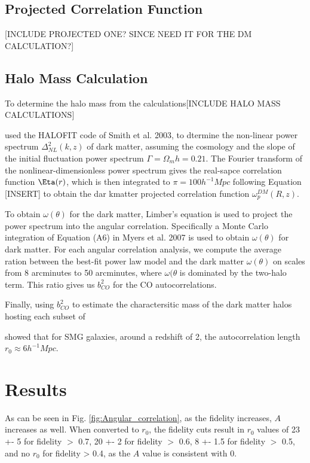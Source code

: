 \subsection{Projected Correlation Function}

[INCLUDE PROJECTED ONE? SINCE NEED IT FOR THE DM CALCULATION?]

\subsection{Halo Mass Calculation}

To determine the halo mass from the calculations[INCLUDE HALO MASS CALCULATIONS]

\cite{hickox2011clustering} used the HALOFIT code of Smith et al. 2003, to dtermine the non-linear power spectrum $\Delta_{NL}^2(k,z)$ of dark matter, assuming the cosmology and the slope of the initial fluctuation power spectrum $\Gamma = \Omega_mh = 0.21$. The Fourier transform of the nonlinear-dimensionless power spectrum gives the real-sapce correlation function $\Eta(r)$, which is then integrated to $\pi = 100 h^{-1} Mpc$ following Equation [INSERT] to obtain the dar kmatter projected correlation function $\omega^{DM}_p(R,z)$.

To obtain $\omega(\theta)$ for the dark matter, Limber's equation is used to project the power spectrum into the angular correlation. Specifically a Monte Carlo integration of Equation (A6) in Myers et al. 2007 is used to obtain $\omega(\theta)$ for dark matter. For each angular correlation analysis, we compute the average ration between the best-fit power law model and the dark matter $\omega(\theta)$ on scales from 8 arcminutes to 50 arcminutes, where $\omega(\theta$ is dominated by the two-halo term. This ratio gives us $b^2_{CO}$ for the CO autocorrelations. 

Finally, using $b^2_{CO}$ to estimate the charactersitic mass of the dark matter halos hosting each subset of 

\cite{hickox2011clustering} showed that for SMG galaxies, around a redshift of 2, the autocorrelation length $r_0 \approx 6 h^{-1} Mpc$. 

\section{Results}

As can be seen in Fig. \ref{fig:Angular_correlation}, as the fidelity increases, $A$ increases as well. When converted to $r_0$, the fidelity cuts result in $r_0$ values of 23 +- 5 for fidelity $>$ 0.7, 20 +- 2 for fidelity $>$ 0.6, 8 +- 1.5 for fidelity $>$ 0.5, and no $r_0$ for fidelity > 0.4, as the $A$ value is consistent with 0. 


